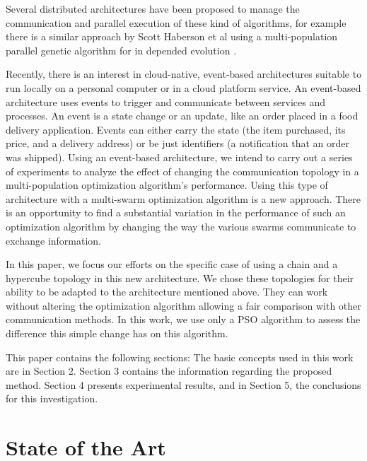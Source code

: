 \documentclass[runningheads]{llncs}
\begin{document}
Several distributed architectures have been proposed to manage the communication
and parallel execution of these kind of algorithms, for example there is a
similar approach by Scott Haberson et al using a multi-population parallel
genetic algorithm for in depended evolution \cite{da1}.

Recently, there is an interest in cloud-native, event-based architectures
suitable to run locally on a personal computer or in a cloud platform
service.
An event-based architecture uses events to trigger and communicate
between services and processes. An event is a state change or an
update, like an order placed in a food delivery application. Events
can either carry the state (the item purchased, its price, and a
delivery address) or be just identifiers (a notification that an order
was shipped). Using an event-based architecture, we intend to carry
out a series of experiments to analyze the effect of changing the
communication topology in a multi-population optimization algorithm's
performance. Using this type of architecture with a multi-swarm
optimization algorithm is a new approach. There is an opportunity to
find a substantial variation in the performance of such an
optimization algorithm by changing the way the various swarms
communicate to exchange information.

In this paper, we focus our efforts on the specific case of using a
chain and a hypercube topology in this new architecture. We chose
these topologies for their ability to be adapted to the architecture
mentioned above. They can work without altering the optimization
algorithm allowing a fair comparison with other communication
methods. In this work, we use only a PSO algorithm to assess the
difference this simple change has on this algorithm.

This paper contains the following sections: The basic concepts used in this work
are in Section 2. Section 3 contains the information regarding the proposed
method. Section 4 presents experimental results, and in Section 5, the
conclusions for this investigation.

\section{State of the Art}
\end{document}
